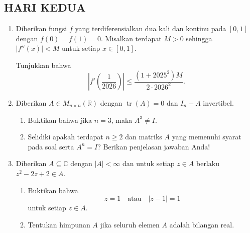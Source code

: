 \documentclass[12pt,twoside]{article}
\begin{document}
\pagebreak
\subsection{HARI KEDUA}
\begin{enumerate}
    \item Diberikan fungsi $f$ yang terdiferensialkan dua kali dan kontinu pada $[0,1]$ dengan
          $
              f(0)=f(1)=0.
          $
          Misalkan terdapat $M>0$ sehingga
          $
              |f''(x)|<M
          $
          untuk setiap $x\in[0,1]$.

          Tunjukkan bahwa
          \[
              \left|f'\!\left(\frac{1}{2026}\right)\right|
              \le
              \frac{(1+2025^2)M}{2\cdot 2026^2}.
          \]

          \bigskip

    \item Diberikan $A\in M_{n\times n}(\mathbb{R})$ dengan
          $
              \operatorname{tr}(A)=0
          $
          dan
          $
              I_n-A
          $
          invertibel.
          \begin{enumerate}
              \item Buktikan bahwa jika $n=3$, maka
                    $
                        A^3\neq I.
                    $

              \item Selidiki apakah terdapat $n\ge 2$ dan matriks $A$ yang memenuhi syarat pada soal serta
                    $
                        A^n=I
                    $? Berikan penjelasan jawaban Anda!
          \end{enumerate}

    \item Diberikan $A\subseteq \mathbb{C}$ dengan $|A|<\infty$ dan untuk setiap $z\in A$ berlaku
          $
              z^2-2z+2\in A.
          $

          \begin{enumerate}
              \item Buktikan bahwa
                    \[
                        z=1
                        \quad
                        \text{atau}
                        \quad
                        |z-1|=1
                    \]
                    untuk setiap $z\in A$.

              \item Tentukan himpunan $A$ jika seluruh elemen $A$ adalah bilangan real.
          \end{enumerate}


\end{enumerate}
\end{document}
